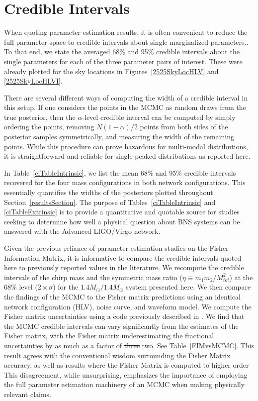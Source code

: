\documentclass[11pt,a4paper]{emulateapj} 
\newcommand{\carl}[1]{{\color{red} #1}}
\begin{document}
\section{Credible Intervals}
\label{ciSection}

When quoting parameter estimation results, it is often convenient to
reduce the full parameter space to credible intervals about single
marginalized parameters..  To that end, we state the averaged 68\% and 95\% credible
intervals about the single parameters for each of the three
parameter pairs of interest.  These were already plotted for the sky
locations in Figures~\ref{2525SkyLocHLV} and \ref{2525SkyLocHLVI}.

There are several different ways of computing the width of a credible
interval in this setup.  If one considers the points in the MCMC as
random draws from the true posterior, then the $\alpha$-level credible
interval can be computed by simply ordering the points, removing
$N(1-\alpha )/2$ points from both sides of the posterior samples
symmetrically, and measuring the width of the remaining points.  While
this procedure can prove hazardous for multi-modal distributions, it
is straightforward and reliable for single-peaked distributions as
reported here.

In Table~\ref{ciTableIntrinsic}, we list the mean 68\% and 95\% credible
intervals recovered for the four mass configurations in both network
configurations. This essentially quantifies the widths of the
posteriors plotted throughout Section~\ref{resultsSection}.  The
purpose of Tables~\ref{ciTableIntrinsic} and \ref{ciTableExtrinsic} is
to provide a quantitative and quotable source for studies seeking to
determine how well a physical question about BNS systems can be
answered with the Advanced LIGO/Virgo network.

Given the previous reliance of parameter estimation studies on the Fisher
Information Matrix, it is informative to compare the credible intervals quoted here 
to previously reported values in the literature.  We recompute the credible intervals 
of the chirp mass and the symmetric mass ratio ($\eta \equiv m_1 m_2 / M_{tot}^2$)
at the 68\% level ($2\times\sigma$) for the $1.4M_{\odot}/1.4M_{\odot}$ system presented 
here.  We then compare the findings of the MCMC to the Fisher matrix predictions using
an identical network configuration (HLV), noise curve, and waveform model.  
We compute the Fisher matrix uncertainties 
using a code previously described in \cite{Inadequacies}.  We find that the MCMC credible
 intervals \carl{can} vary significantly from
the estimates of the Fisher matrix, with the Fisher matrix underestimating the 
fractional uncertainties by as much as a factor of \sout{three} \carl{two}.  See Table~\ref{FIMvsMCMC}.  This 
result agrees with the conventional wisdom surrounding the Fisher Matrix accuracy,
as well as results where the Fisher Matrix is computed to higher order \citep{Vitale2010}
   This disagreement, while 
   unsurprising, emphasizes the importance of employing the full parameter estimation
    machinery of an MCMC when making physically relevant claims.
\end{document}
